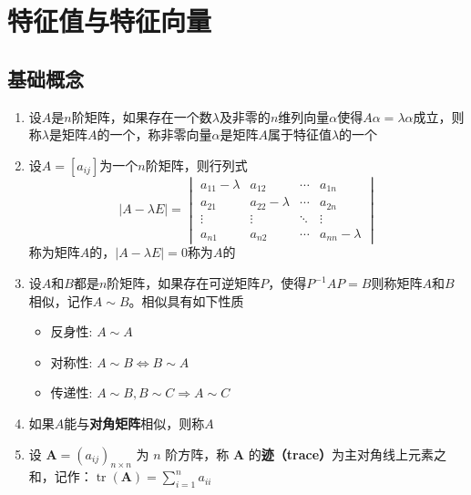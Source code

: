\documentclass[a4paper,12pt]{article}
\begin{document}


    \section{特征值与特征向量}

    \subsection{基础概念}

    \begin{enumerate}
        \item 设$A$是$n$阶矩阵，如果存在一个数$\lambda$及非零的$n$维列向量$\alpha$使得$A\alpha = \lambda\alpha$成立，则称$\lambda$是矩阵$A$的一个{\color[rgb]{0.2, 0.6, 0.3}{特征值}}，称非零向量$\alpha$是矩阵$A$属于特征值$\lambda$的一个{\color[rgb]{0.2, 0.6, 0.3}{特征向量}}
        \item 设$A = [a_{ij}]$为一个$n$阶矩阵，则行列式
        \[
            |A - \lambda E| = \begin{vmatrix}
                                  a_{11} - \lambda & a_{12}           & \cdots & a_{1n}           \\
                                  a_{21}           & a_{22} - \lambda & \cdots & a_{2n}           \\
                                  \vdots           & \vdots           & \ddots & \vdots           \\
                                  a_{n1}           & a_{n2}           & \cdots & a_{nn} - \lambda
            \end{vmatrix}
        \]
        称为矩阵$A$的{\color[rgb]{0.2, 0.6, 0.3}{特征多项式}}，$|A - \lambda E| = 0$称为$A$的{\color[rgb]{0.2, 0.6, 0.3}{特征方程}}
        \item 设$A$和$B$都是$n$阶矩阵，如果存在可逆矩阵$P$，使得$P^{-1}AP = B$则称矩阵$A$和$B$相似，记作$A \sim B$。相似具有如下性质
        \begin{itemize}
            \item 反身性: $A \sim A$
            \item 对称性: $A \sim B \Leftrightarrow B \sim A$
            \item 传递性: $A \sim B, B \sim C \Rightarrow A \sim C$
        \end{itemize}
        \item 如果$A$能与\textbf{对角矩阵}相似，则称$A${\color[rgb]{0.2, 0.6, 0.3}{可对角化}}
        \item 设 $\mathbf{A} = (a_{ij})_{n \times n}$ 为 $n$ 阶方阵，称 $\mathbf{A}$ 的\textbf{迹（trace）}为主对角线上元素之和，记作：$\operatorname{tr}(\mathbf{A}) = \sum_{i=1}^{n} a_{ii}$
    \end{enumerate}
\end{document}
